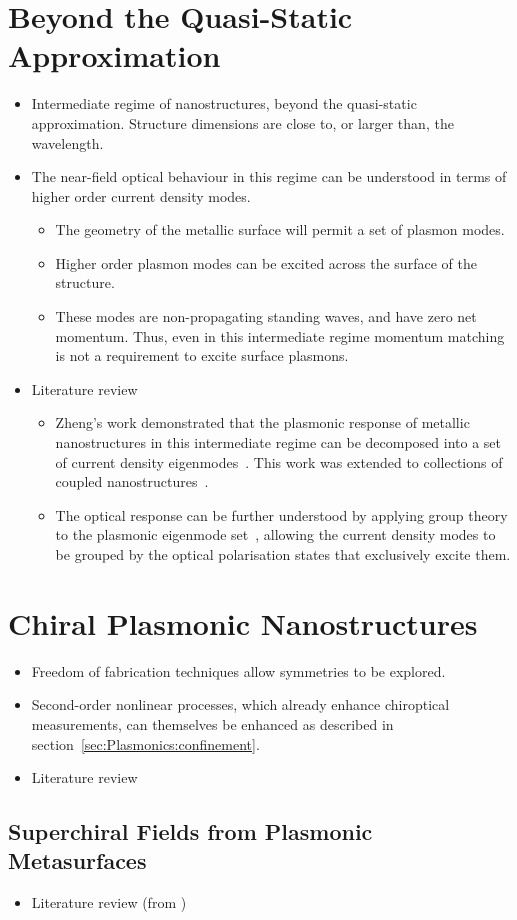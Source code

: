 \section{Beyond the Quasi-Static Approximation}
\begin{itemize}
    \item Intermediate regime of nanostructures, beyond the quasi-static approximation. Structure dimensions are close to, or larger than, the wavelength.
    \item The near-field optical behaviour in this regime can be understood in terms of higher order current density modes.
    \begin{itemize}
        \item The geometry of the metallic surface will permit a set of plasmon modes.
        \item Higher order plasmon modes can be excited across the surface of the structure.
        \item These modes are non-propagating standing waves, and have zero net momentum. Thus, even in this intermediate regime momentum matching is not a requirement to excite surface plasmons.
    \end{itemize}
    \item Literature review
    \begin{itemize}
        \item Zheng's work demonstrated that the plasmonic response of metallic nanostructures in this intermediate regime can be decomposed into a set of current density eigenmodes~\cite{Zheng2012}. This work was extended to collections of coupled nanostructures~\cite{Zheng2013}. 
        \item The optical response can be further understood by applying group theory to the plasmonic eigenmode set~\cite{Zheng2015}, allowing the current density modes to be grouped by the optical polarisation states that exclusively excite them.
    \end{itemize}
\end{itemize}


\section{Chiral Plasmonic Nanostructures}
\begin{itemize}
    \item Freedom of fabrication techniques allow symmetries to be explored.
    \item Second-order nonlinear processes, which already enhance chiroptical measurements, can themselves be enhanced as described in section~\ref{sec:Plasmonics:confinement}.
    \item Literature review
\end{itemize}

\subsection{Superchiral Fields from Plasmonic Metasurfaces}
\begin{itemize}
    \item Literature review (from \cite{Collins2017})
\end{itemize}